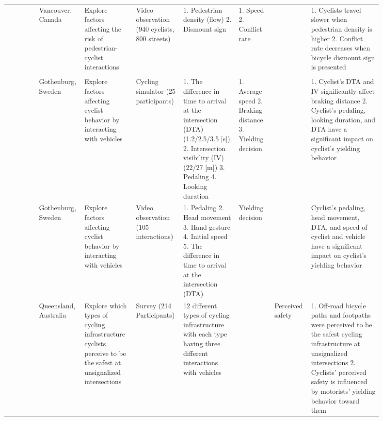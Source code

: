 {\begin{longtable}{@{}
    R{0.085\linewidth}
    R{0.075\linewidth}
    R{0.135\linewidth}
    R{0.095\linewidth}
    R{0.145\linewidth}
    R{0.095\linewidth}
    R{0.085\linewidth}
    R{0.185\linewidth}@{}}
  \citet{essa2018road}
    & Vancouver, Canada
    & Explore factors affecting the risk of pedestrian-cyclist interactions
    & Video observation (940 cyclists, 800 streets)
    & 1. Pedestrian density (flow)
      2. Dismount sign
    & 1. Speed
      2. Conflict rate
    &
    & 1. Cyclists travel slower when pedestrian density is higher
      2. Conflict rate decreases when bicycle dismount sign is presented\\
  \addlinespace[4pt]

  \\
  \addlinespace[2pt]

  \citet{mohammadi2024understanding}
    & Gothenburg, Sweden
    & Explore factors affecting cyclist behavior by interacting with vehicles
    & Cycling simulator (25 participants)
    & 1. The difference in time to arrival at the intersection (DTA)
      (1.2/2.5/3.5 [s])
      2. Intersection visibility (IV) (22/27 [m])
      3. Pedaling
      4. Looking duration
    & 1. Average speed
      2. Braking distance
      3. Yielding decision
    &
    & 1. Cyclist's DTA and IV significantly affect braking distance
      2. Cyclist's pedaling, looking duration, and DTA have a significant impact
      on cyclist's yielding behavior\\
  \addlinespace[4pt]

  \citet{mohammadi2023how}
    & Gothenburg, Sweden
    & Explore factors affecting cyclist behavior by interacting with vehicles
    & Video observation (105 interactions)
    & 1. Pedaling
      2. Head movement
      3. Hand gesture
      4. Initial speed
      5. The difference in time to arrival at the intersection (DTA)
    & Yielding decision
    &
    & Cyclist's pedaling, head movement, DTA, and speed of cyclist and vehicle
      have a significant impact on cyclist's yielding behavior\\
  \addlinespace[4pt]

  \citet{ng2017cyclist}
    & Queensland, Australia
    & Explore which types of cycling infrastructure cyclists perceive to be the
      safest at unsignalized intersections
    & Survey (214 Participants)
    & 12 different types of cycling infrastructure with each type having three
      different interactions with vehicles
    &
    & Perceived safety
    & 1. Off-road bicycle paths and footpaths were perceived to be the safest
      cycling infrastructure at unsignalized intersections
      2. Cyclists' perceived safety is influenced by motorists' yielding
      behavior toward them\\
\end{longtable}
}

